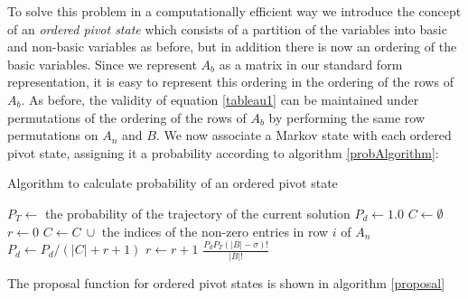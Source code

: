 \documentclass{article}
\begin{document}
To solve this problem in a computationally efficient way we introduce the concept of an \textit{ordered pivot state} which consists of a partition of the variables into basic and non-basic variables as before, but in addition there is now an ordering of the basic variables. Since we represent $A_b$ as a matrix in our standard form representation, it is easy to represent this ordering in the ordering of the rows of $A_b$. As before, the validity of equation \ref{tableau1} can be maintained under permutations of the ordering of the rows of $A_b$ by performing the same row permutations on $A_n$ and $B$. We now associate a Markov state with each ordered pivot state, assigning it a probability according to algorithm \ref{probAlgorithm}:

\begin{algorithm}
\caption{Algorithm to calculate probability of an ordered pivot state}
\label{probAlgorithm}
\begin{algorithmic}
 
\State $P_T \leftarrow$ the probability of the trajectory of the current solution
\State $P_d \leftarrow 1.0$
\State $C \leftarrow \emptyset$
\State $r \leftarrow 0$
	\State $C \leftarrow C \ \cup $ the indices of the non-zero entries in row $i$ of $A_n$
	\State $P_d \leftarrow P_d/(|C|+r+1)$
	\State $r \leftarrow r + 1$
  \EndIf
\EndFor
\State \Return $\frac{P_d P_T(|B|-\sigma)!}{|B|!}$
\EndFunction
\end{algorithmic}
\end{algorithm}

The proposal function for ordered pivot states is shown in algorithm \ref{proposal}
\end{document}
